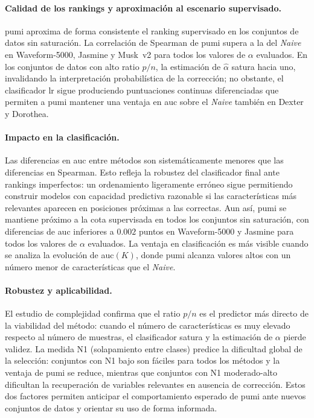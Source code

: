 \paragraph{Calidad de los rankings y aproximación al escenario supervisado.}
\acrshort{pumi} aproxima de forma consistente el ranking supervisado en los conjuntos de datos sin saturación. La correlación de Spearman de \acrshort{pumi} supera a la del \textit{Naive} en Waveform-5000, Jasmine y Musk~v2 para todos los valores de $\alpha$ evaluados. En los conjuntos de datos con alto ratio $p/n$, la estimación de $\hat{\alpha}$ satura hacia uno, invalidando la interpretación probabilística de la corrección; no obstante, el clasificador \acrshort{lr} sigue produciendo puntuaciones continuas diferenciadas que permiten a \acrshort{pumi} mantener una ventaja en \acrshort{auc} sobre el \textit{Naive} también en Dexter y Dorothea.

\paragraph{Impacto en la clasificación.}
Las diferencias en \acrshort{auc} entre métodos son sistemáticamente menores que las diferencias en Spearman. Esto refleja la robustez del clasificador final ante rankings imperfectos: un ordenamiento ligeramente erróneo sigue permitiendo construir modelos con capacidad predictiva razonable si las características más relevantes aparecen en posiciones próximas a las correctas. Aun así, \acrshort{pumi} se mantiene próximo a la cota supervisada en todos los conjuntos sin saturación, con diferencias de \acrshort{auc} inferiores a $0.002$ puntos en Waveform-5000 y Jasmine para todos los valores de $\alpha$ evaluados. La ventaja en clasificación es más visible cuando se analiza la evolución de \acrshort{auc}$(K)$, donde \acrshort{pumi} alcanza valores altos con un número menor de características que el \textit{Naive}.

\paragraph{Robustez y aplicabilidad.}
El estudio de complejidad confirma que el ratio $p/n$ es el predictor más directo de la viabilidad del método: cuando el número de características es muy elevado respecto al número de muestras, el clasificador satura y la estimación de $\alpha$ pierde validez. La medida N1 (solapamiento entre clases) predice la dificultad global de la selección: conjuntos con N1 bajo son fáciles para todos los métodos y la ventaja de \acrshort{pumi} se reduce, mientras que conjuntos con N1 moderado-alto dificultan la recuperación de variables relevantes en ausencia de corrección. Estos dos factores permiten anticipar el comportamiento esperado de \acrshort{pumi} ante nuevos conjuntos de datos y orientar su uso de forma informada.

